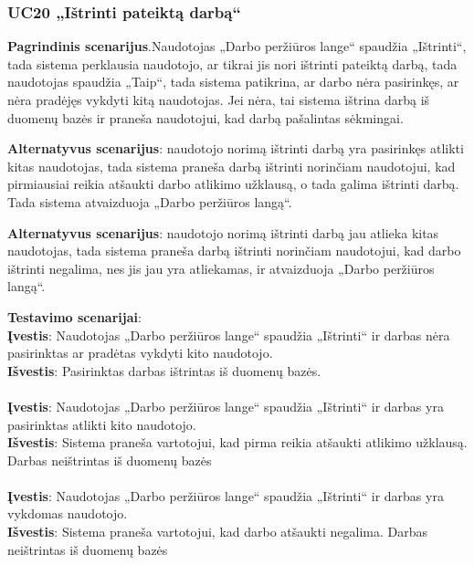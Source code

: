 \documentclass{VUMIFPSbakalaurinis}
\begin{document}
\subsubsection{UC20 „Ištrinti pateiktą darbą“}
\textbf{Pagrindinis scenarijus}.Naudotojas „Darbo peržiūros lange“ spaudžia „Ištrinti“, tada sistema perklausia naudotojo, ar tikrai jis nori ištrinti pateiktą darbą, tada naudotojas spaudžia „Taip“, tada sistema patikrina, ar darbo nėra pasirinkęs, ar nėra pradėjęs vykdyti kitą naudotojas. Jei nėra, tai sistema ištrina darbą iš duomenų bazės ir praneša naudotojui, kad darbą pašalintas sėkmingai.
\par \textbf{Alternatyvus scenarijus}: naudotojo norimą ištrinti darbą yra pasirinkęs atlikti kitas naudotojas, tada sistema praneša darbą ištrinti norinčiam naudotojui, kad pirmiausiai reikia atšaukti darbo atlikimo užklausą, o tada galima ištrinti darbą. Tada sistema atvaizduoja „Darbo peržiūros langą“.
\par \textbf{Alternatyvus scenarijus}: naudotojo norimą ištrinti darbą jau atlieka kitas naudotojas, tada sistema praneša darbą ištrinti norinčiam naudotojui, kad darbo ištrinti negalima, nes jis jau yra atliekamas, ir atvaizduoja „Darbo peržiūros langą“.
\par \textbf{Testavimo scenarijai}:\\
\textbf{Įvestis}: Naudotojas „Darbo peržiūros lange“ spaudžia „Ištrinti“ ir darbas nėra pasirinktas ar pradėtas vykdyti kito naudotojo. \\
\textbf{Išvestis}: Pasirinktas darbas ištrintas iš duomenų bazės. \\ \\
\textbf{Įvestis}: Naudotojas „Darbo peržiūros lange“ spaudžia „Ištrinti“ ir darbas yra pasirinktas atlikti kito naudotojo. \\
\textbf{Išvestis}: Sistema praneša vartotojui, kad pirma reikia atšaukti atlikimo užklausą. Darbas neištrintas iš duomenų bazės\\ \\
\textbf{Įvestis}: Naudotojas „Darbo peržiūros lange“ spaudžia „Ištrinti“ ir darbas yra vykdomas naudotojo. \\
\textbf{Išvestis}: Sistema praneša vartotojui, kad darbo atšaukti negalima. Darbas neištrintas iš duomenų bazės\\ \\
\end{document}
